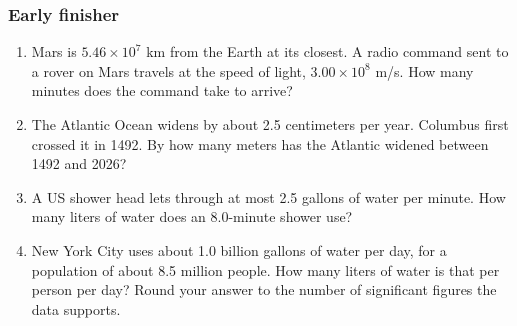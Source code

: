 \documentclass[12pt, twoside]{article}
\begin{document}
\newpage

\subsubsection*{Early finisher}

\begin{enumerate}[resume]

\item Mars is $5.46 \times 10^{7}$ km from the Earth at its closest. A radio
  command sent to a rover on Mars travels at the speed of light,
  $3.00 \times 10^{8}$ m/s. How many minutes does the command take to arrive?
  \vspace{9cm}

\item The Atlantic Ocean widens by about 2.5 centimeters per year. Columbus first
  crossed it in 1492. By how many meters has the Atlantic widened between 1492 and
  2026?

\newpage

\item A US shower head lets through at most 2.5 gallons of water per minute. How many
  liters of water does an 8.0-minute shower use? \vspace{9cm}

\item New York City uses about 1.0 billion gallons of water per day, for a
  population of about 8.5 million people. How many liters of water is that per
  person per day? Round your answer to the number of significant figures the data
  supports.

\end{enumerate}
\end{document}

